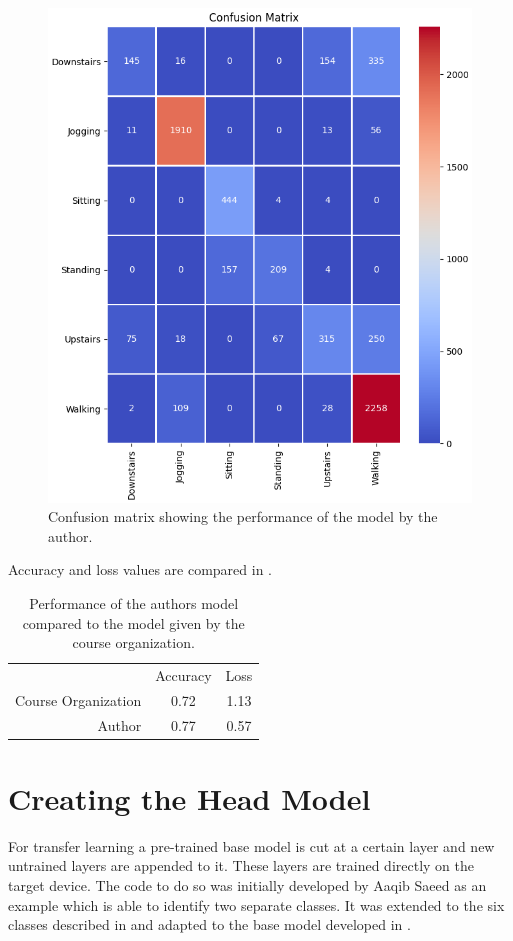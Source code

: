 \begin{figure}[htpb]
\centering
\includegraphics[width=\linewidth]{DidiConvFinalConfusion}
\caption{Confusion matrix showing the performance of the model by the author.}
\label{myfig:DidiConvFinalConfusion}
\end{figure}
Accuracy and loss values are compared in .
\begin{table}
\centering
\begin{tabular}[htpb]{rcc}
                    & Accuracy & Loss \\
Course Organization & 0.72 & 1.13 \\
Author              & 0.77 & 0.57 \\
\end{tabular}
\caption{Performance of the authors model compared to the model given by the course organization.}
\label{tab:accLoss}
\end{table}

\section{Creating the Head Model}
\label{sec:headModel}
For transfer learning a pre-trained base model is cut at a certain layer and new untrained layers are appended to it. These layers are trained directly on the target device. The code to do so was initially developed by Aaqib Saeed\autocite{saeed:transferLearning} as an example which is able to identify two separate classes. It was extended to the six classes described in  and adapted to the base model developed in .

